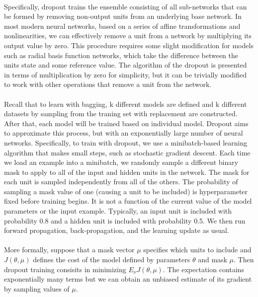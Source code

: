 \paragraph{}
Specifically, dropout trains the ensemble consisting of all sub-networks that can be formed by removing non-output units from an underlying base network.
In most modern neural networks, based on a series of affine transformations and nonlinearities, we can effectively remove a unit from a network by multiplying its output value by zero.
This procedure requires some slight modification for models such as radial basis function networks, which take the difference between the units state and some reference value.
The algorithm of the dropout is presented in terms of multiplication by zero for simplicity, but it can be trivially modified to work with other operations that remove a unit from the network.
\paragraph{}
Recall that to learn with bagging, k different models are defined and k different datasets by sampling from the traning set with replacement are constructed.
After that, each model will be trained based on individual model.
Dropout aims to approximate this process, but with an exponentially large number of neural networks.
Specifically, to train with dropout, we use a minibatch-based learning algorithm that makes small steps, such as stochastic gradient descent.
Each time we load an example into a minibatch, we randomly sample a different binary mask to apply to all of the input and hidden units in the network.
The mask for each unit is sampled independently from all of the others.
The probability of sampling a mask value of one (causing a unit to be included) is hyperparameter fixed before training begins.
It is not a function of the current value of the model parameters or the input example.
Typically, an input unit is included with probability 0.8 and a hidden unit is included with probability 0.5.
We then run forward propagation, back-propagation, and the learning update as usual.
\paragraph{}
More formally, suppose that a mask vector $\mu$ specifies which units to include and $J(\theta,\mu)$ defines the cost of the model defined by parameters $\theta$ and mask $\mu$.
Then dropout training consisits in minimizing $E_\nu J(\theta,\mu)$.
The expectation contains exponentially many terms but we can obtain an unbiased estimate of its gradient by sampling values of $\mu$.
